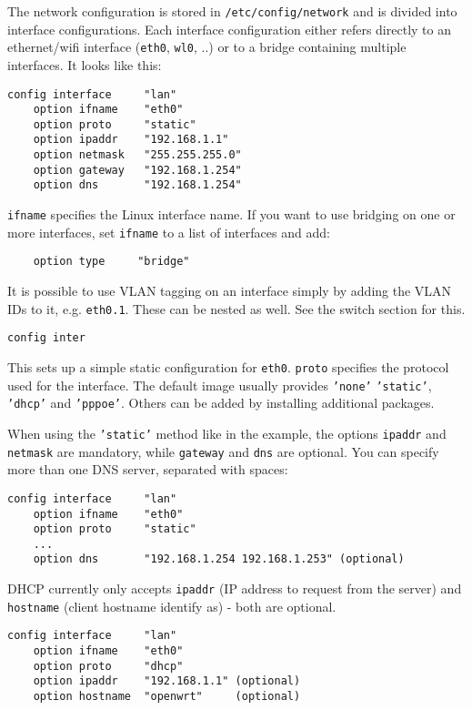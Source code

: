 The network configuration is stored in \texttt{/etc/config/network}
and is divided into interface configurations.
Each interface configuration either refers directly to an ethernet/wifi
interface (\texttt{eth0}, \texttt{wl0}, ..) or to a bridge containing multiple interfaces.
It looks like this:

\begin{Verbatim}
config interface     "lan"
    option ifname    "eth0"
    option proto     "static"
    option ipaddr    "192.168.1.1"
    option netmask   "255.255.255.0"
    option gateway   "192.168.1.254"
    option dns       "192.168.1.254"
\end{Verbatim}

\texttt{ifname} specifies the Linux interface name.
If you want to use bridging on one or more interfaces, set \texttt{ifname} to a list
of interfaces and add:
\begin{Verbatim}
    option type     "bridge"
\end{Verbatim}

It is possible to use VLAN tagging on an interface simply by adding the VLAN IDs
to it, e.g. \texttt{eth0.1}. These can be nested as well. See the switch section for
this.

\begin{Verbatim}
config inter
\end{Verbatim}

This sets up a simple static configuration for \texttt{eth0}. \texttt{proto} specifies the
protocol used for the interface. The default image usually provides \texttt{'none'}
\texttt{'static'}, \texttt{'dhcp'} and \texttt{'pppoe'}. Others can be added by installing additional
packages.

When using the \texttt{'static'} method like in the example, the  options \texttt{ipaddr} and
\texttt{netmask} are mandatory, while \texttt{gateway} and \texttt{dns} are optional.
You can specify more than one DNS server, separated with spaces:

\begin{Verbatim}
config interface     "lan"
    option ifname    "eth0"
    option proto     "static"
    ...
    option dns       "192.168.1.254 192.168.1.253" (optional)
\end{Verbatim}

DHCP currently only accepts \texttt{ipaddr} (IP address to request from the server)
and \texttt{hostname} (client hostname identify as) - both are optional.

\begin{Verbatim}
config interface     "lan"
    option ifname    "eth0"
    option proto     "dhcp"
    option ipaddr    "192.168.1.1" (optional)
    option hostname  "openwrt"     (optional)
\end{Verbatim}

